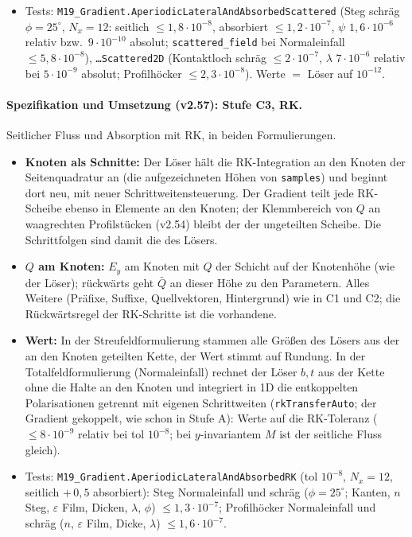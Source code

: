 \begin{itemize}[nosep]
        waren falsch (Höcker mit $g_0=0{,}06$\,µm: seitlicher Fluss 17\,\% daneben, Absorption der verlustfreien
        Struktur schräg $-6{,}7\cdot10^{-3}$, jetzt $3{,}6\cdot10^{-4}$; senkrecht $2\cdot10^{-4}$ wie bei anderen
        Strukturen). \verb|fg::lateralNodes| rechnet ab der Schichtunterkante; Test \verb|M18_Pml.LateralNodesCoverTheStack|.
  \item Tests: \verb|M19_Gradient.AperiodicLateralAndAbsorbedScattered| (Steg schräg $\phi=25^\circ$, $N_x=12$: seitlich
        $\le1{,}8\cdot10^{-8}$, absorbiert $\le1{,}2\cdot10^{-7}$, $\psi$ $1{,}6\cdot10^{-6}$ relativ bzw.\ $9\cdot10^{-10}$ absolut;
        \verb|scattered_field| bei Normaleinfall $\le5{,}8\cdot10^{-8}$), \verb|…Scattered2D| (Kontaktloch schräg $\le2\cdot10^{-7}$,
        $\lambda$ $7\cdot10^{-6}$ relativ bei $5\cdot10^{-9}$ absolut; Profilhöcker $\le2{,}3\cdot10^{-8}$). Werte $=$ Löser
        auf $10^{-12}$.
\end{itemize}

\paragraph{Spezifikation und Umsetzung (v2.57): Stufe C3, RK.}
Seitlicher Fluss und Absorption mit RK, in beiden Formulierungen.
\begin{itemize}[nosep]
  \item \textbf{Knoten als Schnitte:} Der Löser hält die RK-Integration an den Knoten der Seitenquadratur an (die
        aufgezeichneten Höhen von \verb|samples|) und beginnt dort neu, mit neuer Schrittweitensteuerung. Der Gradient teilt jede
        RK-Scheibe ebenso in Elemente an den Knoten; der Klemmbereich von $Q$ an waagrechten Profilstücken (v2.54) bleibt der
        der ungeteilten Scheibe. Die Schrittfolgen sind damit die des Lösers.
  \item \textbf{$Q$ am Knoten:} $E_y$ am Knoten mit $Q$ der Schicht auf der Knotenhöhe (wie der Löser); rückwärts
        geht $\bar Q$ an dieser Höhe zu den Parametern. Alles Weitere (Präfixe, Suffixe, Quellvektoren, Hintergrund) wie
        in C1 und C2; die Rückwärtsregel der RK-Schritte ist die vorhandene.
  \item \textbf{Wert:} In der Streufeldformulierung stammen alle Größen des Lösers aus der an den Knoten geteilten Kette,
        der Wert stimmt auf Rundung. In der Totalfeldformulierung (Normaleinfall) rechnet der Löser $b,t$ aus der Kette ohne
        die Halte an den Knoten und integriert in 1D die entkoppelten Polarisationen getrennt mit eigenen Schrittweiten
        (\verb|rkTransferAuto|; der Gradient gekoppelt, wie schon in Stufe A): Werte auf die RK-Toleranz ($\le8\cdot10^{-9}$
        relativ bei tol $10^{-8}$; bei $y$-invariantem $M$ ist der seitliche Fluss gleich).
  \item Tests: \verb|M19_Gradient.AperiodicLateralAndAbsorbedRK| (tol $10^{-8}$, $N_x=12$, seitlich $+\,0{,}5$ absorbiert): Steg
        Normaleinfall und schräg ($\phi=25^\circ$; Kanten, $n$ Steg, $\varepsilon$ Film, Dicken, $\lambda$, $\phi$)
        $\le1{,}3\cdot10^{-7}$; Profilhöcker Normaleinfall und schräg ($n$, $\varepsilon$ Film, Dicke, $\lambda$)
        $\le1{,}6\cdot10^{-7}$.
\end{itemize}

